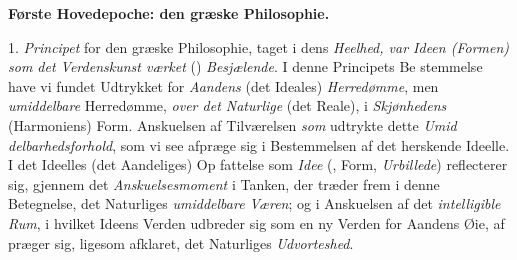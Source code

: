 %
\begin{center}
\textbf{\large Første Hovedepoche: den græske Philosophie.}
\end{center}

1. \emph{Principet} for den græske Philosophie, taget i dens
\emph{Heelhed, var Ideen (Formen) som det Verdenskunst\-%
værket} () \emph{Besjælende}. I denne Principets Be\-%
stemmelse have vi fundet Udtrykket for \emph{Aandens} (det Ideales)
\emph{Herredømme}, men \emph{umiddelbare} Herredømme, \emph{over det
Naturlige} (det Reale), i \emph{Skjønhedens} (Harmoniens) Form.
Anskuelsen af Tilværelsen \emph{som } udtrykte dette \emph{Umid\-%
delbarhedsforhold}, som vi see afpræge sig i Bestemmelsen
af det herskende Ideelle. I det Ideelles (det Aandeliges) Op\-%
fattelse som \emph{Idee} (, Form, \emph{Urbillede}) reflecterer sig,
gjennem det \emph{Anskuelsesmoment} i Tanken, der træder frem
i denne Betegnelse, det Naturliges \emph{umiddelbare Væren};
og i Anskuelsen af det \emph{intelligible Rum}, i hvilket Ideens
Verden udbreder sig som en ny Verden for Aandens Øie, af\-%
præger sig, ligesom afklaret, det Naturliges \emph{Udvorteshed}.

